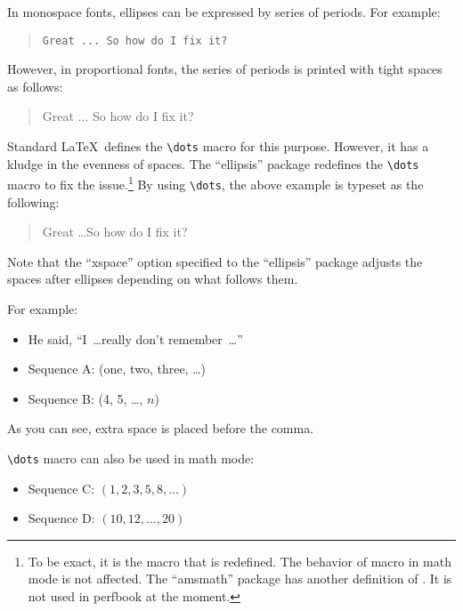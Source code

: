 In monospace fonts, ellipses can be expressed by series of periods.
For example:

\begin{quote}
  \verb|Great ... So how do I fix it?|
\end{quote}

However, in proportional fonts, the series of periods is printed
with tight spaces as follows:

\begin{quote}
  Great ... So how do I fix it?
\end{quote}

Standard \LaTeX\ defines the \verb|\dots| macro for this purpose.
However, it has a kludge in the evenness of spaces.
The ``ellipsis'' package redefines the \verb|\dots| macro to fix
the issue.\footnote{To be exact, it is the \co{\\textellipsis} macro
  that is redefined.
  The behavior of \co{\\dots} macro in math mode is not affected.
  The ``amsmath'' package has another definition of \co{\\dots}.
  It is not used in perfbook at the moment.}
By using \verb|\dots|, the above example is typeset as the following:

\begin{quote}
  Great \dots So how do I fix it?
\end{quote}

Note that the ``xspace'' option specified to the ``ellipsis'' package
adjusts the spaces after ellipses depending on what follows them.

For example:

\begin{itemize}[itemsep=.2ex]
\item He said, ``I~\dots really don't remember~\dots''
\item Sequence A: (one, two, three, \dots)
\item Sequence B: (4, 5, \dots, $n$)
\end{itemize}

As you can see, extra space is placed before the comma.

\verb|\dots| macro can also be used in math mode:

\begin{itemize}[itemsep=.2ex]
\item Sequence C: $(1, 2, 3, 5, 8, \dots)$
\item Sequence D: $(10, 12, \dots, 20)$
\end{itemize}

